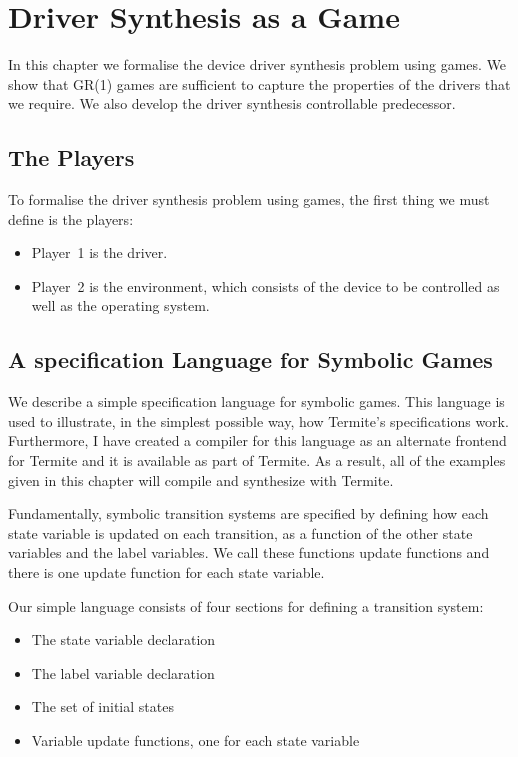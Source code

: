 \chapter{Driver Synthesis as a Game}

In this chapter we formalise the device driver synthesis problem using games. We show that GR(1) games are sufficient to capture the properties of the drivers that we require. We also develop the driver synthesis controllable predecessor.

\section{The Players}

To formalise the driver synthesis problem using games, the first thing we must define is the players:

\begin{itemize}
    \item Player~1 is the driver. 
    \item Player~2 is the environment, which consists of the device to be controlled as well as the operating system.
\end{itemize}


\section{A specification Language for Symbolic Games}

We describe a simple specification language for symbolic games. This language is used to illustrate, in the simplest possible way, how Termite's specifications work. Furthermore, I have created a compiler for this language as an alternate frontend for Termite and it is available as part of Termite. As a result, all of the examples given in this chapter will compile and synthesize with Termite.

Fundamentally, symbolic transition systems are specified by defining how each state variable is updated on each transition, as a function of the other state variables and the label variables. We call these functions update functions and there is one update function for each state variable. 

Our simple language consists of four sections for defining a transition system:
\begin{itemize}
    \item The state variable declaration
    \item The label variable declaration
    \item The set of initial states
    \item Variable update functions, one for each state variable
\end{itemize}

